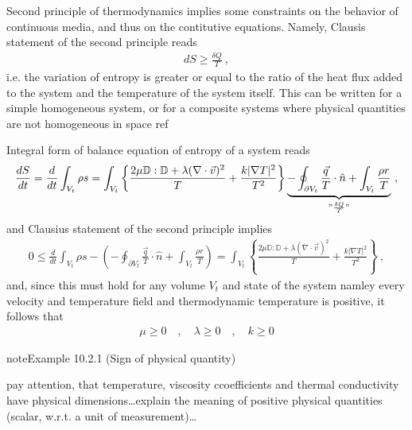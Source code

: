 \documentclass[letterpaper,10pt,english]{jupyterBook}
\begin{document}
\sphinxAtStartPar
{} Second principle of thermodynamics implies some constraints on the behavior of continuous media, and thus on the contitutive equations. Namely, Clausis statement of the second principle reads
\begin{equation*}
\begin{split}d S \ge \frac{\delta Q}{T} \ ,\end{split}
\end{equation*}
\sphinxAtStartPar
i.e. the variation of entropy is greater or equal to the ratio of the heat flux added to the system and the temperature of the system itself. This can be written for a simple homogeneous system, or for a composite systems where physical quantities are not homogeneous in space  ref

\sphinxAtStartPar
Integral form of balance equation of entropy of a system reads
\begin{equation*}
\begin{split}\frac{d S}{dt} = \frac{d}{dt} \int_{V_t} \rho s = \int_{V_t} \left\{ \frac{ 2 \mu \mathbb{D} : \mathbb{D} + \lambda (\nabla \cdot \vec{v})^2}{T} + \frac{k |\nabla T|^2}{T^2} \right\} \underbrace{- \oint_{\partial V_t} \frac{\vec{q}}{T} \cdot \hat{n} + \int_{V_t} \frac{\rho r}{T}}_{"\frac{\delta Q}{T}"} \ ,\end{split}
\end{equation*}
\sphinxAtStartPar
and Clausius statement of the second principle implies
\begin{equation*}
\begin{split}0 \le \frac{d}{dt} \int_{V_t} \rho s - \left( - \oint_{\partial V_t} \frac{\vec{q}}{T} \cdot \hat{n} + \int_{V_t} \frac{\rho r}{T} \right) = \int_{V_t} \left\{ \frac{ 2 \mu \mathbb{D} : \mathbb{D} + \lambda (\nabla \cdot \vec{v})^2}{T} + \frac{k |\nabla T|^2}{T^2} \right\} \ ,\end{split}
\end{equation*}
\sphinxAtStartPar
and, since this must hold for any volume \(V_t\) and state of the system \sphinxhyphen{} namley every velocity and temperature field \sphinxhyphen{} and thermodynamic temperature is positive, it follows that
\begin{equation*}
\begin{split}\mu \ge 0 \quad , \quad \lambda \ge 0 \quad , \quad k \ge 0\end{split}
\end{equation*}\label{ch/fluids/governing-equations:example-1}
\begin{sphinxadmonition}{note}{Example 10.2.1 (Sign of physical quantity)}



\sphinxAtStartPar
{} pay attention, that temperature, viscosity ccoefficients and thermal conductivity have physical dimensions…explain the meaning of positive physical quantities (scalar, w.r.t. a unit of measurement)…
\end{sphinxadmonition}
\end{document}
